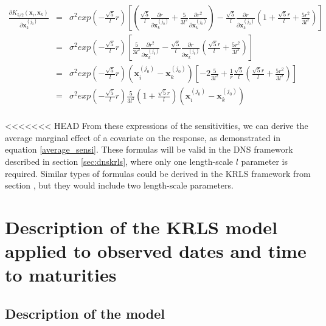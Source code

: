 \begin{itemize}
\begin{eqnarray*}
\frac{\partial K_{5/2}(\textbf{x}_i, \textbf{x}_k)}{\partial \textbf{x}_k^{(j_0)}} &=& \sigma^2 exp\left(-\frac{\sqrt{5}}{l}r\right) \left[ \left( \frac{\sqrt{5}}{l} \frac{\partial r}{\partial \textbf{x}_k^{(j_0)}} + \frac{5}{3 l^2} \frac{\partial r^2}{\partial \textbf{x}_k^{(j_0)}} \right)  - \frac{\sqrt{5}}{l} \frac{\partial r}{\partial \textbf{x}_k^{(j_0)}}\left( 1 + \frac{\sqrt{5}r}{l} + \frac{5 r^2}{3 l^2} \right)\right] \\
&=& \sigma^2 exp\left(-\frac{\sqrt{5}}{l}r\right) \left[ \frac{5}{3 l^2} \frac{\partial r^2}{\partial \textbf{x}_k^{(j_0)}}  - \frac{\sqrt{5}}{l} \frac{\partial r}{\partial \textbf{x}_k^{(j_0)}}\left(\frac{\sqrt{5}r}{l} + \frac{5 r^2}{3 l^2} \right)\right] \\
&=& \sigma^2 exp\left(-\frac{\sqrt{5}}{l}r\right) \left(\textbf{x}_i^{(j_0)} - \textbf{x}_k^{(j_0)} \right) \left[ -2\frac{5}{3 l^2} + \frac{1}{r}\frac{\sqrt{5}}{l} \left(\frac{\sqrt{5}r}{l} + \frac{5 r^2}{3 l^2} \right)\right] \\
&=& \sigma^2 exp\left(-\frac{\sqrt{5}}{l}r\right) \frac{5}{3l^2} \left( 1 + \frac{\sqrt{5} r}{l} \right)\left(\textbf{x}_i^{(j_0)} - \textbf{x}_k^{(j_0)} \right)\\
\end{eqnarray*}

\end{itemize}

<<<<<<< HEAD
From these expressions of the sensitivities, we can derive the average  marginal effect of a covariate on the response, as demonstrated in equation \ref{average_sensi}. These formulas will be valid in the DNS framework described in section \ref{sec:dnskrls}, where only one length-scale $l$ parameter is required. Similar types of formulas could be derived in the KRLS framework from section \label{sec:krls}, but they would include two length-scale parameters. 


\section{Description of the KRLS model applied to observed dates and time to maturities}
\label{sec:krls}

\subsection{Description of the model}

